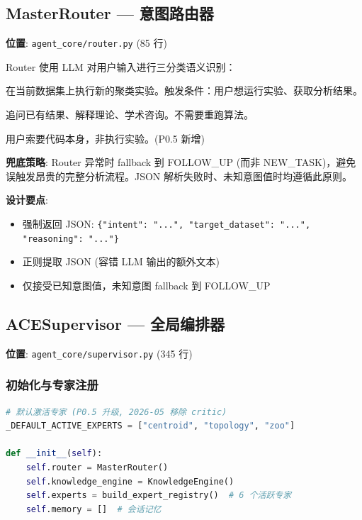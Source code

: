 \documentclass[12pt,a4paper]{article}
\begin{document}
\subsection{MasterRouter --- 意图路由器}

\textbf{位置}: \texttt{agent\_core/router.py} (85 行)

Router 使用 LLM 对用户输入进行三分类语义识别：

\begin{tcolorbox}[title=三种意图, colback=blue!5]
\begin{description}[nosep, style=nextline]
    \item[NEW\_TASK] 在当前数据集上执行新的聚类实验。触发条件：用户想运行实验、获取分析结果。
    \item[FOLLOW\_UP] 追问已有结果、解释理论、学术咨询。不需要重跑算法。
    \item[CODE\_EXAMPLE] 用户索要代码本身，非执行实验。(P0.5 新增)
\end{description}
\end{tcolorbox}

\textbf{兜底策略}: Router 异常时 fallback 到 FOLLOW\_UP (而非 NEW\_TASK)，避免误触发昂贵的完整分析流程。JSON 解析失败时、未知意图值时均遵循此原则。

\textbf{设计要点}:
\begin{itemize}[nosep]
    \item 强制返回 JSON: \texttt{\{"intent": "...", "target\_dataset": "...", "reasoning": "..."\}}
    \item 正则提取 JSON (容错 LLM 输出的额外文本)
    \item 仅接受已知意图值，未知意图 fallback 到 FOLLOW\_UP
\end{itemize}

\subsection{ACESupervisor --- 全局编排器}

\textbf{位置}: \texttt{agent\_core/supervisor.py} (345 行)

\subsubsection{初始化与专家注册}

\begin{lstlisting}[language=Python]
# 默认激活专家 (P0.5 升级, 2026-05 移除 critic)
_DEFAULT_ACTIVE_EXPERTS = ["centroid", "topology", "zoo"]

def __init__(self):
    self.router = MasterRouter()
    self.knowledge_engine = KnowledgeEngine()
    self.experts = build_expert_registry()  # 6 个活跃专家
    self.memory = []  # 会话记忆
\end{lstlisting}
\end{document}
